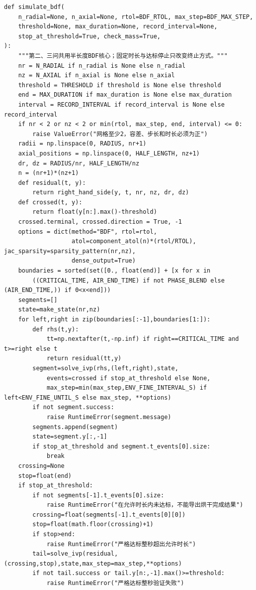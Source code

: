 \documentclass[12pt,a4paper]{ctexart}
\begin{document}
\begin{lstlisting}[caption={solve\_problem3.py }]
def simulate_bdf(
    n_radial=None, n_axial=None, rtol=BDF_RTOL, max_step=BDF_MAX_STEP,
    threshold=None, max_duration=None, record_interval=None,
    stop_at_threshold=True, check_mass=True,
):
    """第二、三问共用半长度BDF核心；固定时长与达标停止只改变终止方式。"""
    nr = N_RADIAL if n_radial is None else n_radial
    nz = N_AXIAL if n_axial is None else n_axial
    threshold = THRESHOLD if threshold is None else threshold
    end = MAX_DURATION if max_duration is None else max_duration
    interval = RECORD_INTERVAL if record_interval is None else record_interval
    if nr < 2 or nz < 2 or min(rtol, max_step, end, interval) <= 0:
        raise ValueError("网格至少2，容差、步长和时长必须为正")
    radii = np.linspace(0, RADIUS, nr+1)
    axial_positions = np.linspace(0, HALF_LENGTH, nz+1)
    dr, dz = RADIUS/nr, HALF_LENGTH/nz
    n = (nr+1)*(nz+1)
    def residual(t, y):
        return right_hand_side(y, t, nr, nz, dr, dz)
    def crossed(t, y):
        return float(y[n:].max()-threshold)
    crossed.terminal, crossed.direction = True, -1
    options = dict(method="BDF", rtol=rtol,
                   atol=component_atol(n)*(rtol/RTOL), jac_sparsity=sparsity_pattern(nr,nz),
                   dense_output=True)
    boundaries = sorted(set([0., float(end)] + [x for x in
        ((CRITICAL_TIME, AIR_END_TIME) if not PHASE_BLEND else (AIR_END_TIME,)) if 0<x<end]))
    segments=[]
    state=make_state(nr,nz)
    for left,right in zip(boundaries[:-1],boundaries[1:]):
        def rhs(t,y):
            tt=np.nextafter(t,-np.inf) if right==CRITICAL_TIME and t>=right else t
            return residual(tt,y)
        segment=solve_ivp(rhs,(left,right),state,
            events=crossed if stop_at_threshold else None,
            max_step=min(max_step,ENV_FINE_INTERVAL_S) if left<ENV_FINE_UNTIL_S else max_step, **options)
        if not segment.success:
            raise RuntimeError(segment.message)
        segments.append(segment)
        state=segment.y[:,-1]
        if stop_at_threshold and segment.t_events[0].size:
            break
    crossing=None
    stop=float(end)
    if stop_at_threshold:
        if not segments[-1].t_events[0].size:
            raise RuntimeError("在允许时长内未达标，不能导出烘干完成结果")
        crossing=float(segments[-1].t_events[0][0])
        stop=float(math.floor(crossing)+1)
        if stop>end:
            raise RuntimeError("严格达标整秒超出允许时长")
        tail=solve_ivp(residual,(crossing,stop),state,max_step=max_step,**options)
        if not tail.success or tail.y[n:,-1].max()>=threshold:
            raise RuntimeError("严格达标整秒验证失败")

\end{lstlisting}
\end{document}
